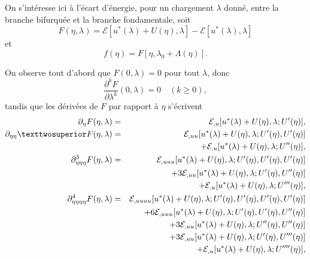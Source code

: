 \documentclass[12pt, final]{amsart}
\begin{document}
On s'intéresse ici à l'écart d'énergie, pour un chargement \(\lambda \) donné, entre
la branche bifurquée et la branche fondamentale, soit
\begin{equation}
  F(\eta , \lambda ) = \mathcal E[u^*(\lambda )+U(\eta ), \lambda ]-\mathcal E[u^*(\lambda ), \lambda ]
\end{equation}
et
\begin{equation}
  f(\eta ) = F[\eta , \lambda _0+\Lambda (\eta )].
\end{equation}

On observe tout d'abord que \(F(0, \lambda )=0\) pour tout \(\lambda \), donc
\begin{equation}
  \frac{\partial ^kF}{\partial \lambda ^k}(0, \lambda )=0\quad(k\geq0),
\end{equation}
tandis que les dérivées de \(F\) par rapport à \(\eta \) s'écrivent
\begin{eqnarray}
  \partial _\eta F(\eta , \lambda )&=&\mathcal E_{,u}[u^*(\lambda )+U(\eta ), \lambda ; U'(\eta )],\\
  \notag
  \partial _{\eta \eta }²F(\eta , \lambda )&=&\mathcal E_{,uu}[u^*(\lambda )+U(\eta ), \lambda ; U'(\eta ), U'(\eta )]\\
               &&+\mathcal E_{,u}[u^*(\lambda )+U(\eta ), \lambda ; U''(\eta )],\\
  \notag
  \partial _{\eta \eta \eta }^3F(\eta , \lambda )&=&\mathcal E_{,uuu}[u^*(\lambda )+U(\eta ), \lambda ; U'(\eta ), U'(\eta ), U'(\eta )]\\
  \notag
            &&+3\mathcal E_{,uu}[u^*(\lambda )+U(\eta ), \lambda ; U'(\eta ), U''(\eta )]\\
               &&+\mathcal E_{,u}[u^*(\lambda )+U(\eta ), \lambda ; U'''(\eta )],\\
  \notag
  \partial _{\eta \eta \eta \eta }^4F(\eta , \lambda )&=&\mathcal E_{,uuuu}[u^*(\lambda )+U(\eta ), \lambda ; U'(\eta ), U'(\eta ), U'(\eta ), U'(\eta )]\\
  \notag
               &&+6\mathcal E_{,uuu}[u^*(\lambda )+U(\eta ), \lambda ; U'(\eta ), U'(\eta ), U''(\eta )]\\
  \notag
               &&+3\mathcal E_{,uu}[u^*(\lambda )+U(\eta ), \lambda ; U''(\eta ), U''(\eta )]\\
  \notag
               &&+3\mathcal E_{,uu}[u^*(\lambda )+U(\eta ), \lambda ; U'(\eta ), U'''(\eta )]\\
               &&+\mathcal E_{,u}[u^*(\lambda )+U(\eta ), \lambda ; U''''(\eta )],
\end{eqnarray}
\end{document}
